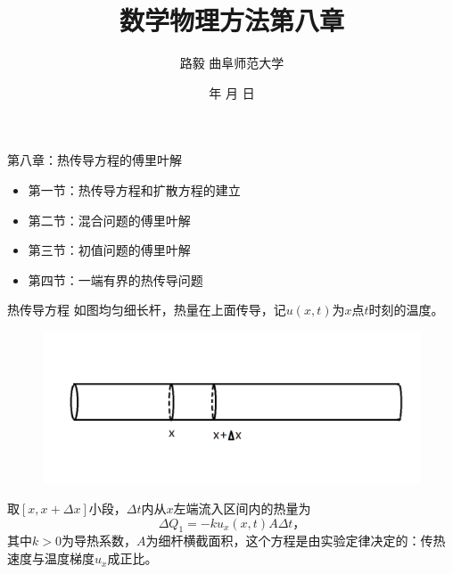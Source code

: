 \documentclass[11pt]{beamer}
\begin{document}
	\author{ 路毅 \hspace{0.3cm} 曲阜师范大学 }
	\date{\number\year 年 \number\month 月 \number\day 日}
	\title{数学物理方法第八章}

\begin{frame}
	\maketitle
\end{frame}

\kaishu

\begin{frame}{第八章：热传导方程的傅里叶解}
\begin{itemize}
	\item 第一节：热传导方程和扩散方程的建立
	\vspace{1cm}
	\item 第二节：混合问题的傅里叶解
	\vspace{1cm}
	\item 第三节：初值问题的傅里叶解
	\vspace{1cm}
	\item 第四节：一端有界的热传导问题	
\end{itemize}
\end{frame}

\begin{frame}{热传导方程}
如图均匀细长杆，热量在上面传导，记$u(x,t)$为$x$点$t$时刻的温度。
\begin{figure}
\centering
\includegraphics[width=0.7\linewidth]{chap8扩散方程}
\end{figure}
取$[x,x+\Delta x]$小段，$\Delta t$内从$x$左端流入区间内的热量为
\begin{equation}
\Delta Q_1 = -k u_x (x,t) A \Delta t，
\end{equation}
其中$k>0$为导热系数，$A$为细杆横截面积，这个方程是由实验定律决定的：传热速度与温度梯度$u_x$成正比。
\end{frame}
\end{document}

